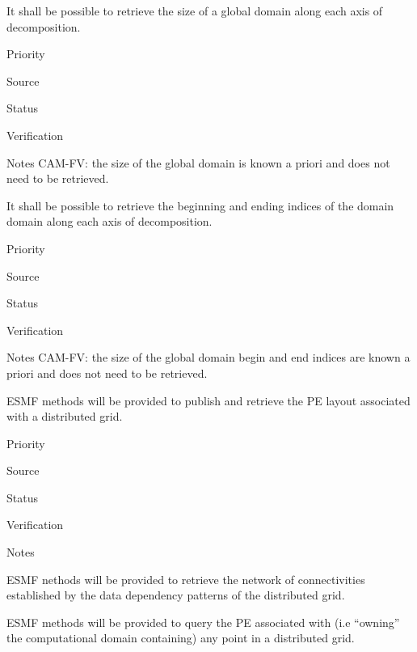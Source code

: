 
It shall be possible to retrieve the size of a global domain
along each axis of decomposition.

\begin{reqlist}
\item[Priority]
\item[Source]
\item[Status]
\item[Verification]
\item[Notes] CAM-FV: the size of the global domain is known
a priori and does not need to be retrieved.
\end{reqlist}


It shall be possible to retrieve the beginning and ending indices of the
domain domain along each axis of decomposition.

\begin{reqlist}
\item[Priority]
\item[Source]
\item[Status]
\item[Verification]
\item[Notes] CAM-FV: the size of the global domain begin and end
indices are known a priori and does not need to be retrieved.
\end{reqlist}


ESMF methods will be provided to publish and retrieve the PE layout
associated with a distributed grid.

\begin{reqlist}
\item[Priority]
\item[Source]
\item[Status]
\item[Verification]
\item[Notes]
\end{reqlist}


ESMF nethods will be provided to retrieve the network of
connectivities established by the data dependency patterns of the
distributed grid.


ESMF methods will be provided to query the PE associated with (i.e
``owning'' the computational domain containing) any point in a
distributed grid.

